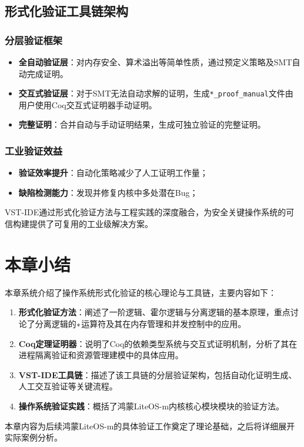 \subsection{形式化验证工具链架构}
\label{subsec:toolchain-arch}

\subsubsection{分层验证框架}
\begin{itemize}
    \item \textbf{全自动验证层}：对内存安全、算术溢出等简单性质，通过预定义策略及SMT自动完成证明。
    \item \textbf{交互式验证层}：对于SMT无法自动求解的证明，生成\texttt{*\_proof\_manual}文件由用户使用Coq交互式证明器手动证明。
    \item \textbf{完整证明}：合并自动与手动证明结果，生成可独立验证的完整证明。
\end{itemize}

\subsubsection{工业验证效益}
\begin{itemize}
    \item \textbf{验证效率提升}：自动化策略减少了人工证明工作量；
    \item \textbf{缺陷检测能力}：发现并修复内核中多处潜在Bug；
\end{itemize}

VST-IDE通过形式化验证方法与工程实践的深度融合，为安全关键操作系统的可信构建提供了可复用的工业级解决方案。
\section*{本章小结}
\label{sec:chapter-summary}

本章系统介绍了操作系统形式化验证的核心理论与工具链，主要内容如下：

\begin{enumerate}[leftmargin=*]
    \item \textbf{形式化验证方法}：阐述了一阶逻辑、霍尔逻辑与分离逻辑的基本原理，重点讨论了分离逻辑的$\ast$运算符及其在内存管理和并发控制中的应用。
    
    \item \textbf{Coq定理证明器}：说明了Coq的依赖类型系统与交互式证明机制，分析了其在进程隔离验证和资源管理建模中的具体应用。
    
    \item \textbf{VST-IDE工具链}：描述了该工具链的分层验证架构，包括自动化证明生成、人工交互验证等关键流程。
    
    \item \textbf{操作系统验证实践}：概括了鸿蒙LiteOS-m内核核心模块模块的验证方法。
\end{enumerate}

本章内容为后续鸿蒙LiteOS-m的具体验证工作奠定了理论基础，之后将详细展开实际案例分析。